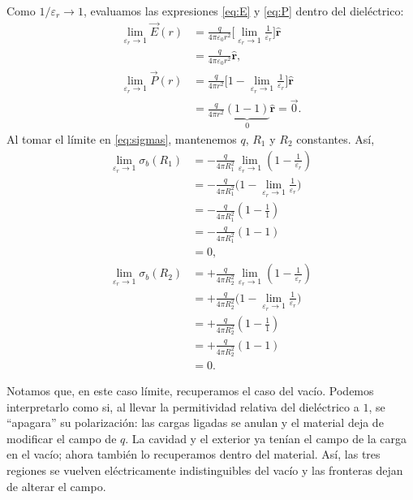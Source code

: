 \documentclass[11pt]{article}
\newcommand{\er}{\hat{\mathbf r}}
\begin{document}
Como $1/\varepsilon_r\to1$, evaluamos las expresiones
\eqref{eq:E} y \eqref{eq:P} dentro del dieléctrico:
\begin{align*}
  \lim_{\varepsilon_r\to1}\vec E(r)
    &=\frac{q}{4\pi\varepsilon_0r^2}
      \Biggl[
        \lim_{\varepsilon_r\to1}\frac{1}{\varepsilon_r}
      \Biggr]\er\\
    &=\frac{q}{4\pi\varepsilon_0r^2}\er,\\[8pt]
  \lim_{\varepsilon_r\to1}\vec P(r)
    &=\frac{q}{4\pi r^2}
      \Biggl[
        1-\lim_{\varepsilon_r\to1}\frac{1}{\varepsilon_r}
      \Biggr]\er\\
    &=\frac{q}{4\pi r^2}
      \underbrace{(1-1)}_{0}\er
      =\vec0.
\end{align*}
Al tomar el límite en \eqref{eq:sigmas}, mantenemos
$q$, $R_1$ y $R_2$ constantes. Así,
\begingroup
\setlength{\jot}{7pt}
\begin{align*}
  \lim_{\varepsilon_r\to1}\sigma_b(R_1)
    &=-\frac{q}{4\pi R_1^2}
      \lim_{\varepsilon_r\to1}
      \left(1-\frac{1}{\varepsilon_r}\right)\\
    &=-\frac{q}{4\pi R_1^2}
      \Biggl(
        1-\lim_{\varepsilon_r\to1}
        \frac{1}{\varepsilon_r}
      \Biggr)\\
    &=-\frac{q}{4\pi R_1^2}
      \left(1-\frac{1}{1}\right)\\
    &=-\frac{q}{4\pi R_1^2}(1-1)\\
    &=0,\\[10pt]
  \lim_{\varepsilon_r\to1}\sigma_b(R_2)
    &=+\frac{q}{4\pi R_2^2}
      \lim_{\varepsilon_r\to1}
      \left(1-\frac{1}{\varepsilon_r}\right)\\
    &=+\frac{q}{4\pi R_2^2}
      \Biggl(
        1-\lim_{\varepsilon_r\to1}
        \frac{1}{\varepsilon_r}
      \Biggr)\\
    &=+\frac{q}{4\pi R_2^2}
      \left(1-\frac{1}{1}\right)\\
    &=+\frac{q}{4\pi R_2^2}(1-1)\\
    &=0.
\end{align*}
\endgroup

Notamos que, en este caso límite, recuperamos el caso del vacío.
Podemos interpretarlo como si, al llevar la permitividad relativa
del dieléctrico a $1$, se ``apagara'' su polarización: las cargas
ligadas se anulan y el material deja de modificar el campo de $q$.
La cavidad y el exterior ya tenían el campo de la carga en el
vacío; ahora también lo recuperamos dentro del material.
Así, las tres regiones se vuelven eléctricamente indistinguibles
del vacío y las fronteras dejan de alterar el campo.
\end{document}
